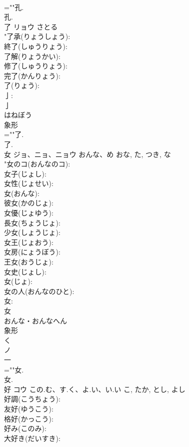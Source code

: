 \documentclass[8pt]{extreport}
\begin{document}
\begin{CJK}{UTF8}{min}
\\	=""孔.
\\	孔.
\\	了	リョウ		さとる	
\\	"了承(りょうしょう): 
\\	終了(しゅうりょう): 
\\	了解(りょうかい): 
\\	修了(しゅうりょう): 
\\	完了(かんりょう): 
\\	了(りょう): 
\\	亅: 
\\	亅	
\\	はねぼう	
\\	象形 
\\	=""了.
\\	了.
\\	女	ジョ、ニョ、ニョウ	おんな、め	おな, た, つき, な	
\\	"女のコ(おんなのコ): 
\\	女子(じょし): 
\\	女性(じょせい): 
\\	女(おんな): 
\\	彼女(かのじょ): 
\\	女優(じょゆう): 
\\	長女(ちょうじょ): 
\\	少女(しょうじょ): 
\\	女王(じょおう): 
\\	女房(にょうぼう): 
\\	王女(おうじょ): 
\\	女史(じょし): 
\\	女(じょ): 
\\	女の人(おんなのひと): 
\\	女: 
\\	女	
\\	おんな・おんなへん	
\\	象形 
\\	く
\\	ノ
\\	一
\\	=""女.
\\	女.
\\	好	コウ	この.む、す.く、よ.い、い.い	こ, たか, とし, よし	
\\	好調(こうちょう): 
\\	友好(ゆうこう): 
\\	格好(かっこう): 
\\	好み(このみ): 
\\	大好き(だいすき): 

\end{CJK}
\end{document}
